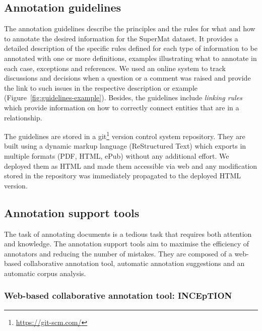 \documentclass[fleqn,10pt]{wlscirep}
\begin{document}
\subsection*{Annotation guidelines}
\label{subsec:annotation-guidelines}
The annotation guidelines describe the principles and the rules for what and how to annotate the desired information for the SuperMat dataset. It provides a detailed description of the specific rules defined for each type of information to be annotated with one or more definitions, examples illustrating what to annotate in each case, exceptions and references. We used an online system to track discussions and decisions when a question or a comment was raised and provide the link to such issues in the respective description or example (Figure~\ref{fig:guidelines-example}). 
Besides, the guidelines include \textit{linking rules} which provide information on how to correctly connect entities that are in a relationship. 

The guidelines are stored in a git\footnote{\url{https://git-scm.com/}} version control system repository. 
They are built using a dynamic markup language (ReStructured Text) which exports in multiple formats (PDF, HTML, ePub) without any additional effort. 
We deployed them as HTML and made them accessible via web and any modification stored in the repository was immediately propagated to the deployed HTML version. 

\subsection*{Annotation support tools}
\label{subsec:annotation-support-tool}
The task of annotating documents is a tedious task that requires both attention and knowledge.
The annotation support tools aim to maximise the efficiency of annotators and reducing the number of mistakes. 
They are composed of a web-based collaborative annotation tool, automatic annotation suggestions and an automatic corpus analysis. 

\subsubsection*{Web-based collaborative annotation tool: INCEpTION}
\label{subsec:annotation-tool}
\end{document}

